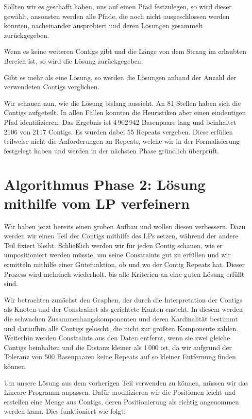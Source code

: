 Sollten wir es geschafft haben, uns auf einen Pfad festzulegen, so wird dieser gewählt, ansonsten werden alle Pfade, die noch nicht ausgeschlossen werden konnten, nacheinander ausprobiert und deren Lösungen gesammelt zurückgegeben.

Wenn es keine weiteren Contigs gibt und die Länge von dem Strang im erlaubten Bereich ist, so wird die Lösung zurückgegeben.

Gibt es mehr als eine Lösung, so werden die Lösungen anhand der Anzahl der verwendeten Contigs verglichen. 

Wir schauen nun, wie die Lösung bislang aussieht. An 81 Stellen haben sich die Contigs aufgeteilt. In allen Fällen konnten die Heuristiken aber einen eindeutigen Pfad identifizieren. Das Ergebnis ist 4\,902\,942 Basenpaare lang und beinhaltet 2106 von 2117 Contigs. Es wurden dabei 55 Repeats vergeben. Diese erfüllen teilweise nicht die Anforderungen an Repeats, welche wir in der Formalisierung festgelegt haben und werden in der nächsten Phase gründlich überprüft.


\chapter{Algorithmus Phase 2: Lösung mithilfe vom LP verfeinern}
Wir haben jetzt bereits einen groben Aufbau und wollen diesen verbessern. Dazu werden wir einen Teil der Contigs mithilfe des LPs setzen, während der andere Teil fixiert bleibt. Schließlich werden wir für jeden Contig schauen, wie er umpositioniert werden müsste, um seine Constraints gut zu erfüllen und wir ermitteln mithilfe einer Gütefunktion, ob und wo der Contig Repeats hat. Dieser Prozess wird mehrfach wiederholt, bis alle Kriterien an eine guten Lösung erfüllt sind.

Wir betrachten zunächst den Graphen, der durch die Interpretation der Contigs als Knoten und der Constrainst als gerichtete Kanten ensteht. In diesem werden die schwachen Zusammenhangskomponenten und deren Kardinalität bestimmt und daraufhin alle Contigs gelöscht, die nicht zur größten Komponente zählen.
Weiterhin werden Constraints aus den Daten entfernt, wenn sie zwei gleiche Contigs beinhalten und die Distanz kleiner als 1\,000 ist, da wir aufgrund der Toleranz von 500 Basenpaaren keine Repeats auf so kleiner Entfernung finden können.

Um unsere Lösung aus dem vorherigen Teil verwenden zu können, müssen wir das Lineare Programm anpassen. Dafür modifizieren wir die Positionen leicht und erstellen eine Menge aus Contigs, deren Positionierung als richtig angenommen werden kann. Dies funktioniert wie folgt:


